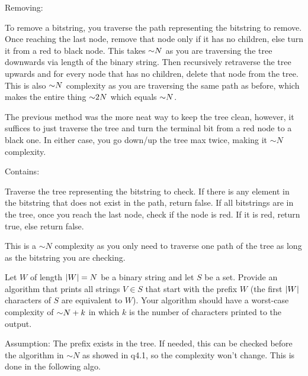 \begin{problem}
\begin{questions}

Removing:

To remove a bitstring, you traverse the path representing the bitstring to remove. Once reaching the last node, remove that node only if it has no children, else turn it from a red to black node. This takes $\mathord{\sim}N$ as you are traversing the tree downwards via length of the binary string. Then recursively retraverse the tree upwards and for every node that has no children, delete that node from the tree. This is also $\mathord{\sim}N$ complexity as you are traversing the same path as before, which makes the entire thing $\mathord{\sim}2N$ which equals $\mathord{\sim}N$.

The previous method was the more neat way to keep the tree clean, however, it suffices to just traverse the tree and turn the terminal bit from a red node to a black one. In either case, you go down/up the tree max twice, making it $\sim N$ complexity.

Contains:

Traverse the tree representing the bitstring to check. If there is any element in the bitstring that does not exist in the path, return false. If all bitstrings are in the tree, once you reach the last node, check if the node is red. If it is red, return true, else return false.

This is a $\sim N$ complexity as you only need to traverse one path of the tree as long as the bitstring you are checking. 

\item Let $W$ of length $\lvert W \rvert = N$ be a binary string and let $S$ be a  set. Provide an algorithm that prints all strings $V \in S$ that start with the prefix $W$ (the first $\lvert W \rvert$ characters of $S$ are equivalent to $W$). Your algorithm should have a worst-case complexity of $\mathord{\sim}N + k$ in which $k$ is the number of characters printed to the output.

Assumption: The prefix exists in the tree. If needed, this can be checked before the algorithm in $\sim N$ as showed in q4.1, so the complexity won't change. This is done in the following algo.


\end{questions}
\end{problem}
